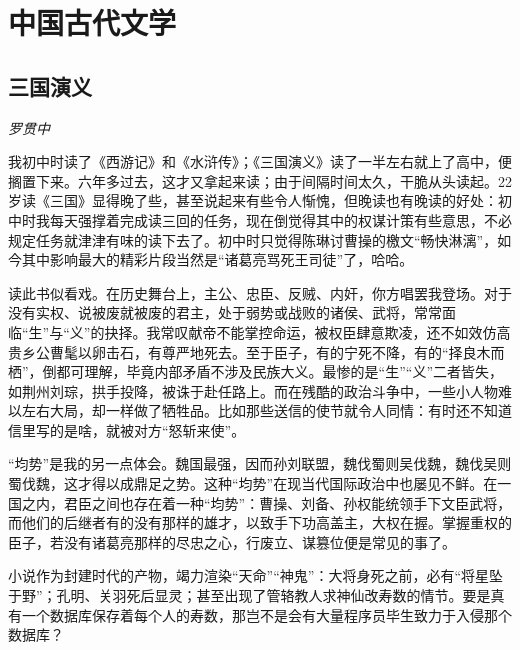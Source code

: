 
\section{中国古代文学}

\subsection*{三国演义}
\par \emph{罗贯中} 
\par 我初中时读了《西游记》和《水浒传》；《三国演义》读了一半左右就上了高中，便搁置下来。六年多过去，这才又拿起来读；由于间隔时间太久，干脆从头读起。22岁读《三国》显得晚了些，甚至说起来有些令人惭愧，但晚读也有晚读的好处：初中时我每天强撑着完成读三回的任务，现在倒觉得其中的权谋计策有些意思，不必规定任务就津津有味的读下去了。初中时只觉得陈琳讨曹操的檄文“畅快淋漓”，如今其中影响最大的精彩片段当然是“诸葛亮骂死王司徒”了，哈哈。
\par 读此书似看戏。在历史舞台上，主公、忠臣、反贼、内奸，你方唱罢我登场。对于没有实权、说被废就被废的君主，处于弱势或战败的诸侯、武将，常常面临“生”与“义”的抉择。我常叹献帝不能掌控命运，被权臣肆意欺凌，还不如效仿高贵乡公曹髦以卵击石，有尊严地死去。至于臣子，有的宁死不降，有的“择良木而栖”，倒都可理解，毕竟内部矛盾不涉及民族大义。最惨的是“生”“义”二者皆失，如荆州刘琮，拱手投降，被诛于赴任路上。而在残酷的政治斗争中，一些小人物难以左右大局，却一样做了牺牲品。比如那些送信的使节就令人同情：有时还不知道信里写的是啥，就被对方“怒斩来使”。
\par “均势”是我的另一点体会。魏国最强，因而孙刘联盟，魏伐蜀则吴伐魏，魏伐吴则蜀伐魏，这才得以成鼎足之势。这种“均势”在现当代国际政治中也屡见不鲜。在一国之内，君臣之间也存在着一种“均势”：曹操、刘备、孙权能统领手下文臣武将，而他们的后继者有的没有那样的雄才，以致手下功高盖主，大权在握。掌握重权的臣子，若没有诸葛亮那样的尽忠之心，行废立、谋篡位便是常见的事了。
\par 小说作为封建时代的产物，竭力渲染“天命”“神鬼”：大将身死之前，必有“将星坠于野”；孔明、关羽死后显灵；甚至出现了管辂教人求神仙改寿数的情节。要是真有一个数据库保存着每个人的寿数，那岂不是会有大量程序员毕生致力于入侵那个数据库？
\par {}

